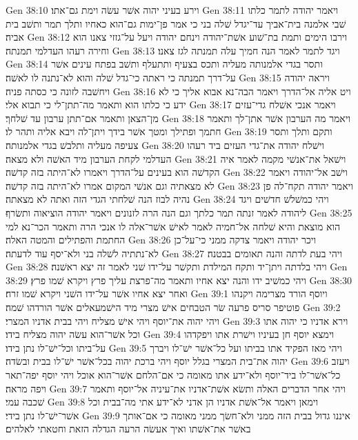Gen 38:10  וירע בעיני יהוה אשׁר עשׂה וימת גם־אתו׃
Gen 38:11  ויאמר יהודה לתמר כלתו שׁבי אלמנה בית־אביך עד־יגדל שׁלה בני כי אמר פן־ימות גם־הוא כאחיו ותלך תמר ותשׁב בית אביה׃
Gen 38:12  וירבו הימים ותמת בת־שׁוע אשׁת־יהודה וינחם יהודה ויעל על־גזזי צאנו הוא וחירה רעהו העדלמי תמנתה׃
Gen 38:13  ויגד לתמר לאמר הנה חמיך עלה תמנתה לגז צאנו׃
Gen 38:14  ותסר בגדי אלמנותה מעליה ותכס בצעיף ותתעלף ותשׁב בפתח עינים אשׁר על־דרך תמנתה כי ראתה כי־גדל שׁלה והוא לא־נתנה לו לאשׁה׃
Gen 38:15  ויראה יהודה ויחשׁבה לזונה כי כסתה פניה׃
Gen 38:16  ויט אליה אל־הדרך ויאמר הבה־נא אבוא אליך כי לא ידע כי כלתו הוא ותאמר מה־תתן־לי כי תבוא אלי׃
Gen 38:17  ויאמר אנכי אשׁלח גדי־עזים מן־הצאן ותאמר אם־תתן ערבון עד שׁלחך׃
Gen 38:18  ויאמר מה הערבון אשׁר אתן־לך ותאמר חתמך ופתילך ומטך אשׁר בידך ויתן־לה ויבא אליה ותהר לו׃
Gen 38:19  ותקם ותלך ותסר צעיפה מעליה ותלבשׁ בגדי אלמנותה׃
Gen 38:20  וישׁלח יהודה את־גדי העזים ביד רעהו העדלמי לקחת הערבון מיד האשׁה ולא מצאה׃
Gen 38:21  וישׁאל את־אנשׁי מקמה לאמר איה הקדשׁה הוא בעינים על־הדרך ויאמרו לא־היתה בזה קדשׁה׃
Gen 38:22  וישׁב אל־יהודה ויאמר לא מצאתיה וגם אנשׁי המקום אמרו לא־היתה בזה קדשׁה׃
Gen 38:23  ויאמר יהודה תקח־לה פן נהיה לבוז הנה שׁלחתי הגדי הזה ואתה לא מצאתה׃
Gen 38:24  ויהי כמשׁלשׁ חדשׁים ויגד ליהודה לאמר זנתה תמר כלתך וגם הנה הרה לזנונים ויאמר יהודה הוציאוה ותשׂרף׃
Gen 38:25  הוא מוצאת והיא שׁלחה אל־חמיה לאמר לאישׁ אשׁר־אלה לו אנכי הרה ותאמר הכר־נא למי החתמת והפתילים והמטה האלה׃
Gen 38:26  ויכר יהודה ויאמר צדקה ממני כי־על־כן לא־נתתיה לשׁלה בני ולא־יסף עוד לדעתה׃
Gen 38:27  ויהי בעת לדתה והנה תאומים בבטנה׃
Gen 38:28  ויהי בלדתה ויתן־יד ותקח המילדת ותקשׁר על־ידו שׁני לאמר זה יצא ראשׁנה׃
Gen 38:29  ויהי כמשׁיב ידו והנה יצא אחיו ותאמר מה־פרצת עליך פרץ ויקרא שׁמו פרץ׃
Gen 38:30  ואחר יצא אחיו אשׁר על־ידו השׁני ויקרא שׁמו זרח׃
Gen 39:1  ויוסף הורד מצרימה ויקנהו פוטיפר סריס פרעה שׂר הטבחים אישׁ מצרי מיד הישׁמעאלים אשׁר הורדהו שׁמה׃
Gen 39:2  ויהי יהוה את־יוסף ויהי אישׁ מצליח ויהי בבית אדניו המצרי׃
Gen 39:3  וירא אדניו כי יהוה אתו וכל אשׁר־הוא עשׂה יהוה מצליח בידו׃
Gen 39:4  וימצא יוסף חן בעיניו וישׁרת אתו ויפקדהו על־ביתו וכל־ישׁ־לו נתן בידו׃
Gen 39:5  ויהי מאז הפקיד אתו בביתו ועל כל־אשׁר ישׁ־לו ויברך יהוה את־בית המצרי בגלל יוסף ויהי ברכת יהוה בכל־אשׁר ישׁ־לו בבית ובשׂדה׃
Gen 39:6  ויעזב כל־אשׁר־לו ביד־יוסף ולא־ידע אתו מאומה כי אם־הלחם אשׁר־הוא אוכל ויהי יוסף יפה־תאר ויפה מראה׃
Gen 39:7  ויהי אחר הדברים האלה ותשׂא אשׁת־אדניו את־עיניה אל־יוסף ותאמר שׁכבה עמי׃
Gen 39:8  וימאן ויאמר אל־אשׁת אדניו הן אדני לא־ידע אתי מה־בבית וכל אשׁר־ישׁ־לו נתן בידי׃
Gen 39:9  איננו גדול בבית הזה ממני ולא־חשׂך ממני מאומה כי אם־אותך באשׁר את־אשׁתו ואיך אעשׂה הרעה הגדלה הזאת וחטאתי לאלהים׃
